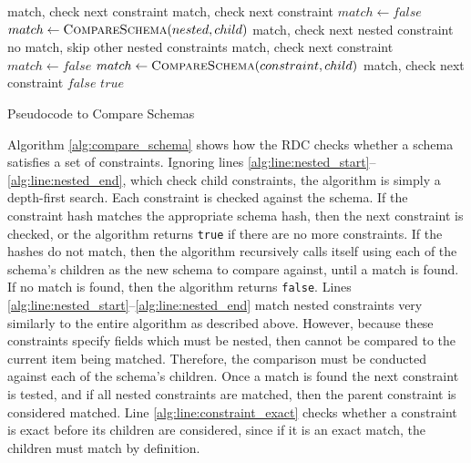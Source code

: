 \documentclass[12pt,twoside,notitlepage]{report}
\begin{document}
\begin{algorithm}
\begin{algorithmic}[1]
			 \label{alg:line:constraint_exact}
				\Continue \Comment match, check next constraint
				\Continue \Comment match, check next constraint
			\Else \label{alg:line:nested_start}
					\State $match\gets false$
						\State $match\gets \Call{CompareSchema}{nested, child}$
							\Continue \Comment match, check next nested constraint
						\EndIf
					\EndFor
						\Break \Comment no match, skip other nested constraints
					\EndIf
				\EndFor
					\Continue \Comment match, check next constraint
				\EndIf
			\EndIf \label{alg:line:nested_end}
		\Else
			\State $match\gets false$
				\State $match\gets \Call{CompareSchema}{constraint, child}$
					\Continue \Comment match, check next constraint
				\EndIf
			\EndFor
				\State \Return $false$
			\EndIf
		\EndIf
	\EndFor
	\State \Return $true$
\EndFunction 
\end{algorithmic}
\caption{Pseudocode to Compare Schemas}
\label{alg:compare_schema}
\end{algorithm}

Algorithm \ref{alg:compare_schema} shows how the RDC checks whether a schema satisfies a set of constraints. 
Ignoring lines \ref{alg:line:nested_start}--\ref{alg:line:nested_end}, which check child constraints, the algorithm is simply a depth-first search. 
Each constraint is checked against the schema. 
If the constraint hash matches the appropriate schema hash, then the next constraint is checked, or the algorithm returns {\tt true} if there are no more constraints. 
If the hashes do not match, then the algorithm recursively calls itself using each of the schema's children as the new schema to compare against, until a match is found. 
If no match is found, then the algorithm returns {\tt false}. 
Lines \ref{alg:line:nested_start}--\ref{alg:line:nested_end} match nested constraints very similarly to the entire algorithm as described above. 
However, because these constraints specify fields which must be nested, then cannot be compared to the current item being matched. 
Therefore, the comparison must be conducted against each of the schema's children. 
Once a match is found the next constraint is tested, and if all nested constraints are matched, then the parent constraint is considered matched. 
Line \ref{alg:line:constraint_exact} checks whether a constraint is exact before its children are considered, since if it is an exact match, the children must match by definition. 
\end{document}
